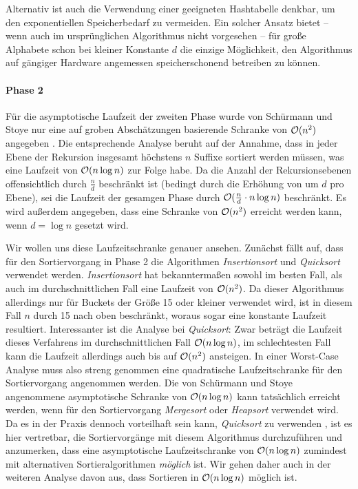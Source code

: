 Alternativ ist auch die Verwendung einer geeigneten Hashtabelle denkbar, um den exponentiellen Speicherbedarf zu vermeiden. Ein solcher Ansatz bietet -- wenn auch im ursprünglichen Algorithmus nicht vorgesehen -- für große Alphabete schon bei kleiner Konstante \(d\) die einzige Möglichkeit, den Algorithmus auf gängiger Hardware angemessen speicherschonend betreiben zu können.
\paragraph*{Phase 2}
Für die asymptotische Laufzeit der zweiten Phase wurde von Schürmann und Stoye nur eine auf groben Abschätzungen basierende Schranke von \(\mathcal{O}(n^2)\) angegeben \cite[Kapitel~3.2]{saca:2}. Die entsprechende Analyse beruht auf der Annahme, dass in jeder Ebene der Rekursion insgesamt höchstens \(n\) Suffixe sortiert werden müssen, was eine Laufzeit von \(\mathcal{O}(n \log n)\) zur Folge habe. Da die Anzahl der Rekursionsebenen offensichtlich durch \(\frac n d\) beschränkt ist (bedingt durch die Erhöhung von \offset um \(d\) pro Ebene), sei die Laufzeit der gesamgen Phase durch \(\mathcal{O}(\frac n d \cdot n \log n)\) beschränkt. Es wird außerdem angegeben, dass eine Schranke von \(\mathcal{O}(n^2)\) erreicht werden kann, wenn \(d = \log n\) gesetzt wird.\par\smallskip
Wir wollen uns diese Laufzeitschranke genauer ansehen. Zunächst fällt auf, dass für den Sortiervorgang in Phase 2 die Algorithmen \emph{Insertionsort} und \emph{Quicksort} verwendet werden. \emph{Insertionsort} hat bekanntermaßen sowohl im besten Fall, als auch im durchschnittlichen Fall eine Laufzeit von \(\mathcal{O}(n^2)\). Da dieser Algorithmus allerdings nur für Buckets der Größe 15 oder kleiner verwendet wird, ist in diesem Fall \(n\) durch 15 nach oben beschränkt, woraus sogar eine konstante Laufzeit resultiert. Interessanter ist die Analyse bei \emph{Quicksort}: Zwar beträgt die Laufzeit dieses Verfahrens im durchschnittlichen Fall \(\mathcal{O}(n \log n)\), im schlechtesten Fall kann die Laufzeit allerdings auch bis auf \(\mathcal{O}(n^2)\) ansteigen. In einer Worst-Case Analyse muss also streng genommen eine quadratische Laufzeitschranke für den Sortiervorgang angenommen werden. Die von Schürmann und Stoye angenommene asymptotische Schranke von \(\mathcal{O}(n \log n)\) kann tatsächlich erreicht werden, wenn für den Sortiervorgang \emph{Mergesort} oder \emph{Heapsort} verwendet wird. Da es in der Praxis dennoch vorteilhaft sein kann, \emph{Quicksort} zu verwenden \cite[Tabelle~1]{quicksort}, ist es hier vertretbar, die Sortiervorgänge mit diesem Algorithmus durchzuführen und anzumerken, dass eine asymptotische Laufzeitschranke von \(\mathcal{O}(n \log n)\) zumindest mit alternativen Sortieralgorithmen \emph{möglich} ist. Wir gehen daher auch in der weiteren Analyse davon aus, dass Sortieren in \(\mathcal{O}(n \log n)\) möglich ist.\par

